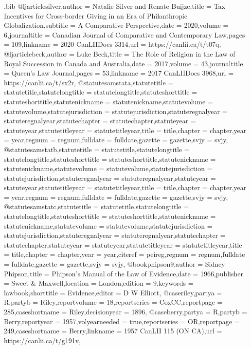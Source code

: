 \begin{filecontents*}[overwrite]{\jobname.bib}
@ljarticle{silver,author = {Natalie Silver and Renate Buijze},title = {Tax Incentives for Cross-border Giving in an Era of Philanthropic Globalization},subtitle = {A Comparative Perspective},date = {2020},volume = {6},journaltitle = {Canadian Journal of Comparative and Contemporary Law},pages = {109},linkname = {2020 CanLIIDocs 3314},url = {https://canlii.ca/t/t07q},}
@ljarticle{beck,author = {Luke Beck},title = {The Role of Religion in the Law of Royal Succession in Canada and Australia},date = {2017},volume = {43},journaltitle = {Queen's Law Journal},pages = {53},linkname = {2017 CanLIIDocs 3968},url = {https://canlii.ca/t/sx2r},}
@statute{samstata,statutetitle = {statutetitle},statutelongtitle = {statutelongtitle},statuteshorttitle = {statuteshorttitle},statutenickname = {statutenickname},statutevolume = {statutevolume},statutejurisdiction = {statutejurisdiction},statuteregnalyear = {statuteregnalyear},statutechapter = {statutechapter},statuteyear = {statuteyear},statutetitleyear = {statutetitleyear},title = {title},chapter = {chapter},year = {year},regnum = {regnum},fulldate = {fulldate},gazette = {gazette},svjy = {svjy},}
@statute{samstatb,statutetitle = {statutetitle},statutelongtitle = {statutelongtitle},statuteshorttitle = {statuteshorttitle},statutenickname = {statutenickname},statutevolume = {statutevolume},statutejurisdiction = {statutejurisdiction},statuteregnalyear = {statuteregnalyear},statuteyear = {statuteyear},statutetitleyear = {statutetitleyear},title = {title},chapter = {chapter},year = {year},regnum = {regnum},fulldate = {fulldate},gazette = {gazette},svjy = {svjy},}
@statute{samstatc,statutetitle = {statutetitle},statutelongtitle = {statutelongtitle},statuteshorttitle = {statuteshorttitle},statutenickname = {statutenickname},statutevolume = {statutevolume},statutejurisdiction = {statutejurisdiction},statuteregnalyear = {statuteregnalyear},statutechapter = {statutechapter},statuteyear = {statuteyear},statutetitleyear = {statutetitleyear},title = {title},chapter = {chapter},year = {year},citeref = {peireg},regnum = {regnum},fulldate = {fulldate},gazette = {gazette},svjy = {svjy},}
@book{phipson9,author = {Sidney Phipson},title = {Phipson’s Manual of the Law of Evidence},date = {1966},publisher = {Sweet \& Maxwell},location = {London},edition = {9},keywords = {lawbook},shorttitle = {Evidence},editor = {D W Elliott},}
@case{riley,partya = {R},partyb = {Riley},reportvolume = {18},reportseries = {CoxCC},reportpage = {285},caseshortname = {Riley},decisionyear = {1896},}
@case{berry,partya = {R},partyb = {Berry},reportyear = {1957},volyearneeded = {true},reportseries = {OR},reportpage = {249},caseshortname = {Berry},linkname = {1957 CanLII 115 (ON CA)},url = {https://canlii.ca/t/g191v},}

\end{filecontents*}
